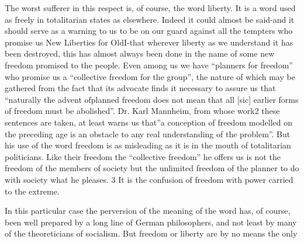 \documentclass[11pt,openany]{book}
\begin{document}
The worst sufferer in this respect is, of course, the word liberty. It is a word used as freely in totalitarian states as elsewhere. Indeed it could almost be said-and it should serve as a warning to us to be on our guard against all the tempters who promise us New Liberties for OldI-that wherever liberty as we understand it has been destroyed, this has almost always been done in the name of some new freedom promised to the people. Even among us we have ``planners for freedom'' who promise us a ``collective freedom for the group'', the nature of which may be gathered from the fact that its advocate finds it necessary to assure us that ``naturally the advent ofplanned freedom does not mean that all [sic] earlier forms of freedom must be abolished''. Dr. Karl Mannheim, from whose work2 these sentences are taken, at least warns us that''a conception of freedom modelled on the preceding age is an obstacle to any real understanding of the problem''. But his use of the word freedom is as misleading as it is in the mouth of totalitarian politicians. Like their freedom the ``collective freedom'' he offers us is not the freedom of the members of society but the unlimited freedom of the planner to do with society what he pleases. 3 It is the confusion of freedom with power carried to the extreme.

In this particular case the perversion of the meaning of the word has, of course, been well prepared by a long line of German philosophers, and not least by many of the theoreticians of socialism. But freedom or liberty are by no means the only
\end{document}
